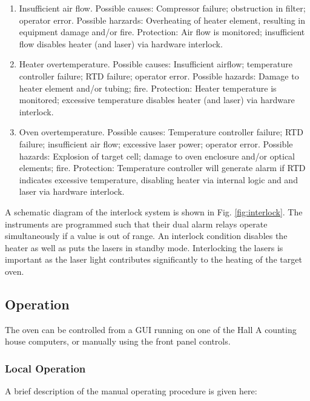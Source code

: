 {\begin{safetyen}{10}{5}
\begin{enumerate}
\item Insufficient air flow. Possible causes: Compressor failure;
obstruction
  in filter; operator error. Possible harzards: Overheating of heater
element,
  resulting in equipment damage and/or fire.
  Protection: Air flow is monitored; insufficient flow disables heater
  (and laser) via hardware interlock.
\item Heater overtemperature. Possible causes: Insufficient airflow;
  temperature controller failure; RTD failure; operator error.
  Possible hazards: Damage to heater element and/or tubing; fire.
  Protection: Heater temperature is monitored; excessive temperature
  disables heater (and laser) via hardware interlock.
\item Oven overtemperature. Possible causes: Temperature controller
failure;
  RTD failure; insufficient air flow; excessive laser power; 
  operator error. Possible hazards: Explosion of target cell; damage
  to oven enclosure and/or optical elements; fire.
  Protection: Temperature controller will generate alarm if RTD
indicates
  excessive temperature, disabling heater via internal logic and 
  and laser via hardware interlock. 
\end{enumerate}

A schematic diagram of 
the interlock system is shown in Fig. \ref{fig:interlock}.
The instruments are programmed such that their dual alarm relays
operate simultaneously if a value is out of range.
An interlock condition disables the heater as well as puts the
lasers in standby mode. Interlocking the
lasers is important as the laser light contributes significantly to
the heating of the target oven. 

\end{safetyen}

\subsection{Operation}
The oven can be controlled from a GUI running
on one of the Hall A counting house computers, or manually using the
front panel controls. 

\subsubsection{Local Operation}
A brief description of the manual operating procedure is given here:

}

